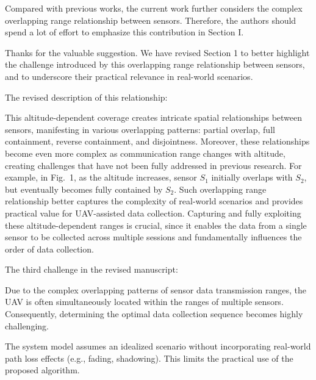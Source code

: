 \reviewer

\begin{revcomment}
	Compared with previous works, the current work further considers the complex overlapping range relationship between sensors. Therefore, the authors should spend a lot of effort to emphasize this contribution in Section I.
\end{revcomment}
\begin{revresponse}
	Thanks for the valuable suggestion.
	We have revised Section 1 to better highlight the challenge introduced by this overlapping range relationship between sensors, and to underscore their practical relevance in real-world scenarios.

	The revised description of this relationship:
	\begin{changes}
		This altitude-dependent coverage creates intricate spatial relationships between sensors, manifesting in various overlapping patterns: partial overlap, full containment, reverse containment, and disjointness.
		Moreover, these relationships become even more complex as communication range changes with altitude, creating challenges that have not been fully addressed in previous research.
		For example, in Fig.~1, as the altitude increases, sensor $S_1$ initially overlaps with $S_2$, but eventually becomes fully contained by $S_2$.
		Such overlapping range relationship better captures the complexity of real-world scenarios and provides practical value for UAV-assisted data collection.
		Capturing and fully exploiting these altitude-dependent ranges is crucial, since it enables the data from a single sensor to be collected across multiple sessions and fundamentally influences the order of data collection.
	\end{changes}
	The third challenge in the revised manuscript:
	\begin{changes}
		Due to the complex overlapping patterns of sensor data transmission ranges, the UAV is often simultaneously located within the ranges of multiple sensors. Consequently, determining the optimal data collection sequence becomes highly challenging.
	\end{changes}
\end{revresponse}

\begin{revcomment}
	The system model assumes an idealized scenario without incorporating real-world path loss effects (e.g., fading, shadowing). This limits the practical use of the proposed algorithm.
\end{revcomment}
\begin{revresponse}
\end{revresponse}

